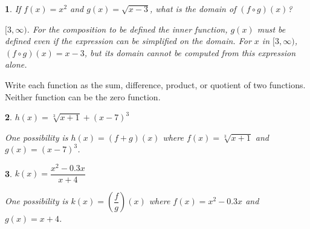 \documentclass{amsbook}
\newtheorem{exc}{}
\newenvironment{ex}{\begin{exc}\normalfont}{\end{exc}}
\numberwithin{section}{chapter}
\numberwithin{equation}{chapter}
\begin{document}
\begin{ex}
	If $f(x) = x^2$ and $g(x) = \sqrt{x-3}$, what is the domain of $(f\circ g)(x)$?
	\begin{sol}
		$[3,\infty)$. For the composition to be defined the inner function, $g(x)$ must be defined even if the expression can be simplified on the domain. For $x$ in $[3,\infty)$, $(f\circ g)(x) = x-3$, but its domain cannot be computed from this expression alone.
	\end{sol}
\end{ex}

Write each function as the sum, difference, product, or quotient of two functions. Neither function can be the zero function.
\begin{multicols}{2}
\begin{ex}
	$h(x) = \sqrt[3]{x+1} +(x-7)^3$
	\begin{sol}
		One possibility is $h(x) = (f+g)(x)$ where $f(x) = \sqrt[3]{x+1}$ and $g(x) = (x-7)^3$.
	\end{sol}
\end{ex}
\begin{ex}
	$k(x) = \dfrac{x^2-0.3x}{x+4}$
	\begin{sol}
		One possibility is $k(x) = \left( \dfrac{f}{g} \right)(x)$ where $f(x) = x^2-0.3x$ and $g(x) = x+4$.
	\end{sol}
\end{ex}
\end{multicols}
\end{document}
